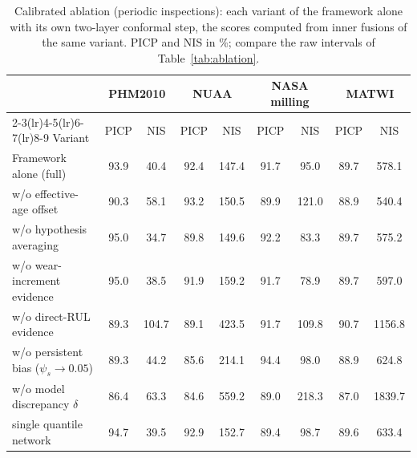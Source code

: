 \begin{table}[!htbp]
\centering
\caption{Calibrated ablation (periodic inspections): each variant of the framework alone with its own two-layer conformal step, the scores computed from inner fusions of the same variant. PICP and NIS in \%; compare the raw intervals of Table~\ref{tab:ablation}.}
\label{tab:Sablcp}
\footnotesize\setlength{\tabcolsep}{3pt}
\begin{tabular}{lcccccccc}
\toprule
 & \multicolumn{2}{c}{PHM2010} & \multicolumn{2}{c}{NUAA} & \multicolumn{2}{c}{NASA milling} & \multicolumn{2}{c}{MATWI}\\
\cmidrule(lr){2-3}\cmidrule(lr){4-5}\cmidrule(lr){6-7}\cmidrule(lr){8-9}
Variant & PICP & NIS & PICP & NIS & PICP & NIS & PICP & NIS\\
\midrule
Framework alone (full) & 93.9 & 40.4 & 92.4 & 147.4 & 91.7 & 95.0 & 89.7 & 578.1\\
\midrule
w/o effective-age offset & 90.3 & 58.1 & 93.2 & 150.5 & 89.9 & 121.0 & 88.9 & 540.4\\
w/o hypothesis averaging & 95.0 & 34.7 & 89.8 & 149.6 & 92.2 & 83.3 & 89.7 & 575.2\\
w/o wear-increment evidence & 95.0 & 38.5 & 91.9 & 159.2 & 91.7 & 78.9 & 89.7 & 597.0\\
w/o direct-RUL evidence & 89.3 & 104.7 & 89.1 & 423.5 & 91.7 & 109.8 & 90.7 & 1156.8\\
w/o persistent bias ($\psi_s\to0.05$) & 89.3 & 44.2 & 85.6 & 214.1 & 94.4 & 98.0 & 88.9 & 624.8\\
w/o model discrepancy $\delta$ & 86.4 & 63.3 & 84.6 & 559.2 & 89.0 & 218.3 & 87.0 & 1839.7\\
single quantile network & 94.7 & 39.5 & 92.9 & 152.7 & 89.4 & 98.7 & 89.6 & 633.4\\
\bottomrule
\end{tabular}
\end{table}
